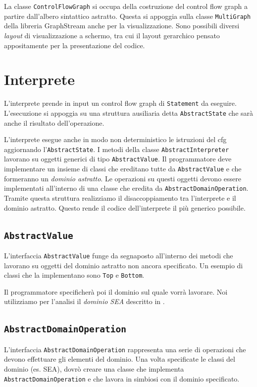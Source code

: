 La classe \texttt{ControlFlowGraph} si occupa della costruzione del control flow graph a partire dall'albero sintattico astratto. Questa si appoggia sulla classe \texttt{MultiGraph} della libreria GraphStream anche per la visualizzazione. Sono possibili diversi \emph{layout} di visualizzazione a schermo, tra cui il layout gerarchico pensato appositamente per la presentazione del codice.

\section{Interprete}

L'interprete prende in input un control flow graph di \texttt{Statement} da eseguire. L'esecuzione si appoggia su una struttura ausiliaria detta \texttt{AbstractState} che sarà anche il risultato dell'operazione. 

L'interprete esegue anche in modo non deterministico le istruzioni del cfg aggiornando l'\texttt{AbstractState}. I metodi della classe \texttt{AbstractInterpreter} lavorano su oggetti generici di tipo \texttt{AbstractValue}. Il programmatore deve implementare un insieme di classi che ereditano tutte da \texttt{AbstractValue} e che formeranno un \emph{dominio astratto}. Le operazioni su questi oggetti devono essere implementati all'interno di una classe che eredita da \texttt{AbstractDomainOperation}. Tramite questa struttura realizziamo il disaccoppiamento tra l'interprete e il dominio astratto. Questo rende il codice dell'interprete il più generico possibile.

\subsection{\texttt{AbstractValue}}

L'interfaccia \texttt{AbstractValue} funge da segnaposto all'interno dei metodi che lavorano su oggetti del dominio astratto non ancora specificato. Un esempio di classi che la implementano sono \texttt{Top} e \texttt{Bottom}. 

Il programmatore specificherà poi il dominio sul quale vorrà lavorare. Noi utilizziamo per l'analisi il \emph{dominio SEA} descritto in \cite{arceri}.

\subsection{\texttt{AbstractDomainOperation}}

L'interfaccia \texttt{AbstractDomainOperation} rappresenta una serie di operazioni che devono effettuare gli elementi del dominio. Una volta specificate le classi del dominio (es. SEA), dovrò creare una classe che implementa \texttt{AbstractDomainOperation} e che lavora in simbiosi con il dominio specificato.

